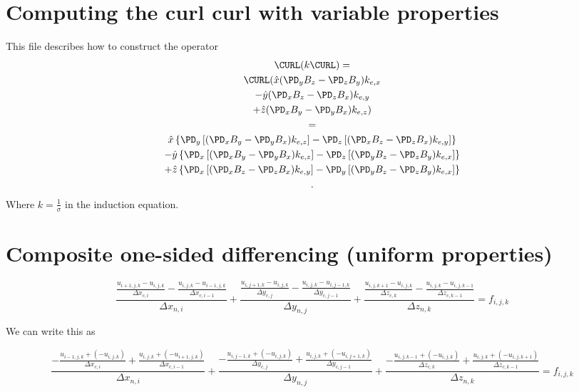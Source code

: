 \documentclass[11pt]{article}
\begin{document}
\doublespacing
\MOONSTITLE
\maketitle

\section{Computing the curl curl with variable properties}
This file describes how to construct the operator
\begin{multline}
	\CURL (k \CURL) = \\
	\CURL (
	\hat{x} (\PD_y B_z - \PD_z B_y) k_{e,x} \\
	- \hat{y} (\PD_x B_z - \PD_z B_x) k_{e,y} \\
	+ \hat{z} (\PD_x B_y - \PD_y B_x) k_{e,z} ) \\
	= \\
	 \hat{x} \left\{ \PD_y \left[ (\PD_x B_y - \PD_y B_x) k_{e,z} \right] -
	  \PD_z \left[ (\PD_x B_z - \PD_z B_x) k_{e,y} \right] \right\} \\
	-\hat{y} \left\{ \PD_x \left[ (\PD_x B_y - \PD_y B_x) k_{e,z} \right] -
	 \PD_z \left[ (\PD_y B_z - \PD_z B_y) k_{e,x} \right]  \right\} \\
	+\hat{z} \left\{ \PD_x \left[ (\PD_x B_z - \PD_z B_x) k_{e,y} \right] -
	 \PD_y \left[ (\PD_y B_z - \PD_z B_y) k_{e,x} \right]  \right\} \\
	.
\end{multline}
Where $k = \frac{1}{\sigma}$ in the induction equation.



\section{Composite one-sided differencing (uniform properties)}

\begin{equation}
	\frac{\frac{u_{i+1,j,k}-u_{i,j,k}}{\Delta x_{c,i}} - \frac{u_{i,j,k}-u_{i-1,j,k}}{\Delta x_{c,i-1}}}{\Delta x_{n,i}} +
	\frac{\frac{u_{i,j+1,k}-u_{i,j,k}}{\Delta y_{c,j}} - \frac{u_{i,j,k}-u_{i,j-1,k}}{\Delta y_{c,j-1}}}{\Delta y_{n,j}} +
	\frac{\frac{u_{i,j,k+1}-u_{i,j,k}}{\Delta z_{c,k}} - \frac{u_{i,j,k}-u_{i,j,k-1}}{\Delta z_{c,k-1}}}{\Delta z_{n,k}} = f_{i,j,k}
\end{equation}

We can write this as

\begin{equation}
	\frac{-
	\frac{
	u_{i-1,j,k}+(-u_{i,j,k})
	}{
	\Delta x_{c,i}} +
	\frac{
	u_{i,j,k}+(-u_{i+1,j,k})
	}{
	\Delta x_{c,i-1}}}{\Delta x_{n,i}} +
	\frac{-
	\frac{
	u_{i,j-1,k}+(-u_{i,j,k})
	}{
	\Delta y_{c,j}} +
	\frac{
	u_{i,j,k}+(-u_{i,j+1,k})
	}{
	\Delta y_{c,j-1}}}{\Delta y_{n,j}} +
	\frac{-
	\frac{
	u_{i,j,k-1}+(-u_{i,j,k})
	}{
	\Delta z_{c,k}} +
	\frac{
	u_{i,j,k}+(-u_{i,j,k+1})
	}{
	\Delta z_{c,k-1}}}{\Delta z_{n,k}} = f_{i,j,k}
\end{equation}
\end{document}
